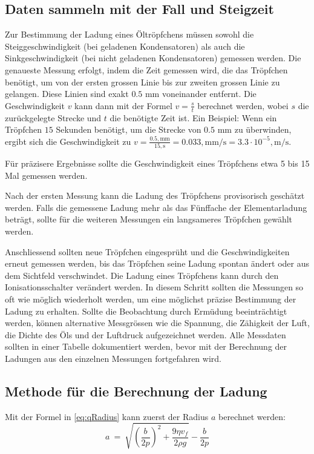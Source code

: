 \subsection{Daten sammeln mit der Fall und Steigzeit}\label{sub:datenFallundSteig}
Zur Bestimmung der Ladung eines Öltröpfchens müssen sowohl die Steiggeschwindigkeit (bei geladenen Kondensatoren) als auch die Sinkgeschwindigkeit (bei nicht geladenen Kondensatoren) gemessen werden. Die genaueste Messung erfolgt, indem die Zeit gemessen wird, die das Tröpfchen benötigt, um von der ersten grossen Linie bis zur zweiten grossen Linie zu gelangen. Diese Linien sind exakt $0.5$ mm voneinander entfernt. Die Geschwindigkeit $v$ kann dann mit der Formel $v = \frac{s}{t}$ berechnet werden, wobei $s$ die zurückgelegte Strecke und $t$ die benötigte Zeit ist. Ein Beispiel: Wenn ein Tröpfchen $15$ Sekunden benötigt, um die Strecke von $0.5$ mm zu überwinden, ergibt sich die Geschwindigkeit zu $v = \frac{0.5,\text{mm}}{15,\text{s}} = 0.033,\text{mm/s} = 3.3 \cdot 10^{-5},\text{m/s}$.

Für präzisere Ergebnisse sollte die Geschwindigkeit eines Tröpfchens etwa 5 bis 15 Mal gemessen werden.

Nach der ersten Messung kann die Ladung des Tröpfchens provisorisch geschätzt werden. Falls die gemessene Ladung mehr als das Fünffache der Elementarladung beträgt, sollte für die weiteren Messungen ein langsameres Tröpfchen gewählt werden.

Anschliessend sollten neue Tröpfchen eingesprüht und die Geschwindigkeiten erneut gemessen werden, bis das Tröpfchen seine Ladung spontan ändert oder aus dem Sichtfeld verschwindet. Die Ladung eines Tröpfchens kann durch den Ionisationsschalter verändert werden. In diesem Schritt sollten die Messungen so oft wie möglich wiederholt werden, um eine möglichst präzise Bestimmung der Ladung zu erhalten. Sollte die Beobachtung durch Ermüdung beeinträchtigt werden, können alternative Messgrössen wie die Spannung, die Zähigkeit der Luft, die Dichte des Öls und der Luftdruck aufgezeichnet werden. Alle Messdaten sollten in einer Tabelle dokumentiert werden, bevor mit der Berechnung der Ladungen aus den einzelnen Messungen fortgefahren wird.

\subsection{Methode für die Berechnung der Ladung}\label{sub:methodeBerechnung}
Mit der Formel in \autoref{eq:qRadius} kann zuerst der Radius $a$ berechnet werden:
\begin{equation*}
	a \ = \ \sqrt{\left( \frac{b}{2p}\right)^2 + \frac{9\eta v_f}{2\rho g}} - \frac{b}{2p}
\end{equation*}

